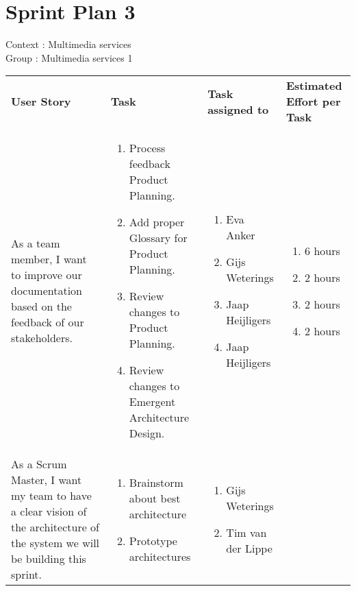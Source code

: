 \documentclass[11pt,a4paper]{article}
\begin{document}
\section*{Sprint Plan 3}
Context : Multimedia services\\
Group : Multimedia services 1\\



\begin{table}[h]
\begin{tabular}{|p{4.5cm}|p{7cm}|p{4cm}|p{2.6cm}|}
\textbf{User Story} & \textbf{Task} & \textbf{Task assigned to} & \textbf{Estimated Effort per Task} \\
As a team member, I want to improve our documentation based on the feedback of our stakeholders.

&
\begin{enumerate}
\item Process feedback Product Planning.
\item Add proper Glossary for Product Planning.
\item Review changes to Product Planning.
\item Review changes to Emergent Architecture Design.
\end{enumerate}

& 
\begin{enumerate}
\item Eva Anker
\item Gijs Weterings
\item Jaap Heijligers
\item Jaap Heijligers
\end{enumerate}

& 
\begin{enumerate}
\item 6 hours
\item 2 hours
\item 2 hours
\item 2 hours
\end{enumerate}
\\

As a Scrum Master, I want my team to have a clear vision of the architecture of the system we will be building this sprint.
&
\begin{enumerate}
\item Brainstorm about best architecture
\item Prototype architectures
\end{enumerate}

&
\begin{enumerate}
\item Gijs Weterings
\item Tim van der Lippe
\end{enumerate}


\end{tabular}
\end{table}
\end{document}
